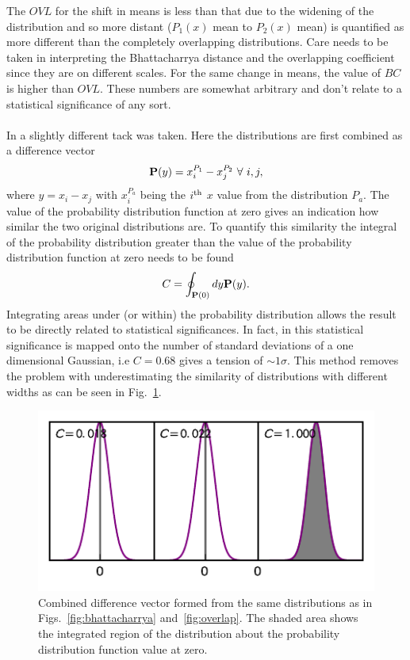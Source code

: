 \documentclass[twocolumn]{revtex4-1}
\begin{document}
    \noindent The $OVL$ for the shift in means is less than that due to the widening of the distribution and so more distant ($P_1(x)$ mean to $P_2(x)$ mean) is quantified as more different than the completely overlapping distributions.
    Care needs to be taken in interpreting the Bhattacharrya distance and the overlapping coefficient since they are on different scales. 
    For the same change in means, the value of $BC$ is higher than $OVL$. 
    These numbers are somewhat arbitrary and don't relate to a statistical significance of any sort.
    \\
    \\
    In \cite{Battye:2014qga} a slightly different tack was taken.
    Here the distributions are first combined as a difference vector
    \begin{equation}
        {\bf P}(y) = x^{P_1}_i-x^{P_2}_j~\forall~i,j,
    \end{equation}
    where $y=x_i-x_j$ with $x^{P_a}_i$ being the $i^{\rm th}$ $x$ value from the distribution $P_a$.
    The value of the probability distribution function at zero gives an indication how similar the two original distributions are.
    To quantify this similarity the integral of the probability distribution greater than the value of the probability distribution function at zero needs to be found
    \begin{equation}
        C = \oint_{{\bf P}(0)} dy{\bf P}(y).
    \end{equation}
    Integrating areas under (or within) the probability distribution allows the result to be directly related to statistical significances.
    In fact, in \cite{Battye:2014qga} this statistical significance is mapped onto the number of standard deviations of a one dimensional Gaussian, i.e $C=0.68$ gives a tension of $\sim1\sigma$.
    This method removes the problem with underestimating the similarity of distributions with different widths as can be seen in Fig.~\ref{fig:charnock}.
    \begin{figure}
        \centering
        \includegraphics{../comparison/plots/Charnock.pdf}
        \caption{Combined difference vector formed from the same distributions as in Figs.~\ref{fig:bhattacharrya} and~\ref{fig:overlap}. The shaded area shows the integrated region of the distribution about the probability distribution function value at zero.}
        \label{fig:charnock}
    \end{figure}
\end{document}
